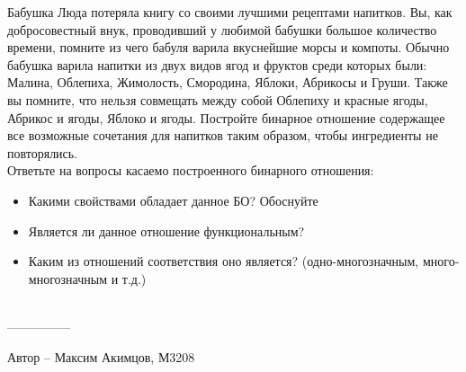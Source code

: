 \question
Бабушка Люда потеряла книгу со своими лучшими рецептами напитков. Вы, как добросовестный внук, проводивший у любимой бабушки большое количество времени, помните из чего бабуля варила вкуснейшие морсы и компоты. Обычно бабушка варила напитки из двух видов ягод и фруктов среди которых были: Малина, Облепиха, Жимолость, Смородина, Яблоки, Абрикосы и Груши. Также вы помните, что нельзя совмещать между собой Облепиху и красные ягоды, Абрикос и ягоды, Яблоко и ягоды. Постройте бинарное отношение содержащее все возможные сочетания для напитков таким образом, чтобы ингредиенты не повторялись.
\\
Ответьте на вопросы касаемо построенного бинарного отношения:
\begin{itemize}
    \item Какими свойствами обладает данное БО? Обоснуйте
    \item Является ли данное отношение функциональным?
    \item Каким из отношений соответствия оно является? (одно-многозначным, много-многозначным и т.д.)
\end{itemize}
\\
---------------

Автор -- Максим Акимцов, М3208